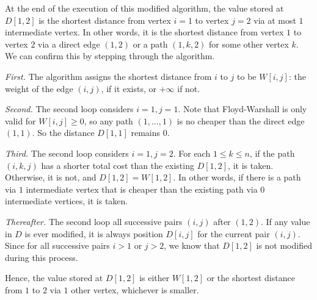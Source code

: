 \begin{solution}
At the end of the execution of this modified algorithm, the value stored at $D[1,2]$ is the shortest distance from vertex $i=1$ to vertex $j=2$ via at most $1$ intermediate vertex. In other words, it is the shortest distance from vertex $1$ to vertex $2$ via a direct edge $(1,2)$ or a path $(1,k,2)$ for some other vertex $k$. We can confirm this by stepping through the algorithm.

\textit{First.} The algorithm assigns the shortest distance from $i$ to $j$ to be $W[i,j]$: the weight of the edge $(i,j)$, if it exists, or $+\infty$ if not.

\textit{Second. }The second loop considers $i=1,j=1$. Note that {\sc Floyd-Warshall} is only valid for $W[i,j]\geq 0$, so any path $(1,\dots,1)$ is no cheaper than the direct edge $(1,1)$. So the distance $D[1,1]$ remains $0$.

\textit{Third. }The second loop considers $i=1,j=2$. For each $1\leq k\leq n$, if the path $(i,k,j)$ has a shorter total cost than the existing $D[1,2]$, it is taken. Otherwise, it is not, and $D[1,2]=W[1,2]$. In other words, if there is a path via $1$ intermediate vertex that is cheaper than the existing path via $0$ intermediate vertices, it is taken.

\textit{Thereafter. }The second loop all successive pairs $(i,j)$ after $(1,2)$. If any value in $D$ is ever modified, it is always position $D[i,j]$ for the current pair $(i,j)$. Since for all successive pairs $i>1$ or $j>2$, we know that $D[1,2]$ is not modified during this process.

Hence, the value stored at $D[1,2]$ is either $W[1,2]$ or the shortest distance from $1$ to $2$ via $1$ other vertex, whichever is smaller.
\end{solution}
